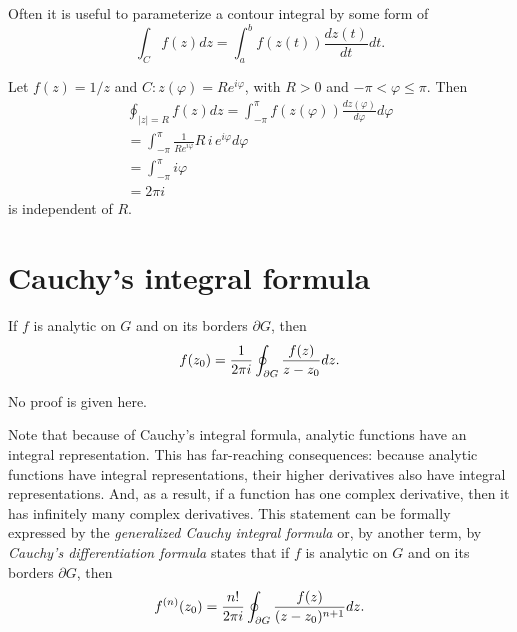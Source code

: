 Often it is useful to parameterize a contour integral by some form of
 \begin{equation}
\int_{C}f(z)dz= \int_{a}^b f(z(t))\frac{dz(t)}{dt} dt.
\end{equation}


{
\color{blue}
\bexample
Let $f(z) = 1/z$ and $C: z(\varphi )=R e^{i\varphi}$, with $R>0$ and $-\pi < \varphi \le \pi$. Then
\begin{equation}
\begin{split}
\oint_{\vert z\vert =R}
f (z) dz
 =
\int_{-\pi}^\pi
f (z(\varphi ))\frac{dz(\varphi )}{d\varphi } d\varphi   \\
=
\int_{-\pi}^\pi
\frac{1}{R e^{i\varphi}}R \, i\, e^{i\varphi} d\varphi   \\
 =
\int_{-\pi}^\pi
i\varphi   \\
=    2\pi i
\end{split}
\end{equation}
is independent of $R$.
\eexample
}



 \section{Cauchy's integral formula}

If $f$ is analytic on $G$ and on its borders $\partial G$, then
\begin{equation}
f(z_0)={1\over 2\pi i}\oint_{\partial G}{f(z)\over z-z_0}dz
 .
\label{2012-m-ch-ca-cif}
\end{equation}

No proof is given here.

Note that because of Cauchy's integral formula, analytic
functions have an integral representation.
This  has far-reaching consequences:
because analytic functions have integral
representations, their higher derivatives also have integral representations.
And, as a result,
if a function has one complex derivative, then it has infinitely many complex derivatives.
This statement can be formally expressed by
the {\em generalized Cauchy  integral formula} or, by another term,
by {\em Cauchy's differentiation formula}
states that if $f$ is analytic on $G$ and on its borders $\partial G$, then
\begin{equation}
f^{(n)}(z_0)={n!\over 2\pi i}\oint_{\partial G}{f(z)\over
 (z-z_0)^{n+1}}dz  .
\label{2012-m-ch-cagcif}
\end{equation}

